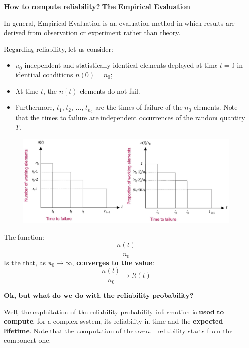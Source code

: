 \newpage

\begin{flushleft}
    \textcolor{Green3}{ \textbf{How to compute reliability? The Empirical Evaluation}}
\end{flushleft}
In general, Empirical Evaluation is an evaluation method in which results are derived from observation or experiment rather than theory.

\highspace
Regarding reliability, let us consider:
\begin{itemize}
    \item $n_{0}$ independent and statistically identical elements deployed at time $t = 0$ in identical conditions $n\left(0\right) = n_{0}$;

    \item At time $t$, the $n\left(t\right)$ elements do not fail.

    \item Furthermore, $t_1$, $t_2$, $\dots$, $t_{n_{0}}$ are the times of failure of the $n_0$ elements. Note that the times to failure are independent occurrences of the random quantity $T$.
\end{itemize}

\begin{figure}[!htp]
    \centering
    \includegraphics[width=\textwidth]{img/reliability-and-availability-2.png}
\end{figure}

\noindent
The function:
\begin{equation}
    \dfrac{n\left(t\right)}{n_{0}}
\end{equation}
Is the  that, as $n_{0} \rightarrow \infty$, \textbf{converges to the value}: 
\begin{equation}
    \dfrac{n\left(t\right)}{n_0} \rightarrow R\left(t\right)
\end{equation}

\highspace
\begin{flushleft}
    \textcolor{Green3}{ \textbf{Ok, but what do we do with the reliability probability?}}
\end{flushleft}
Well, the exploitation of the reliability probability information is \textbf{used to compute}, for a complex system, its reliability in time and the \textbf{expected lifetime}. Note that the computation of the overall reliability starts from the component one.

